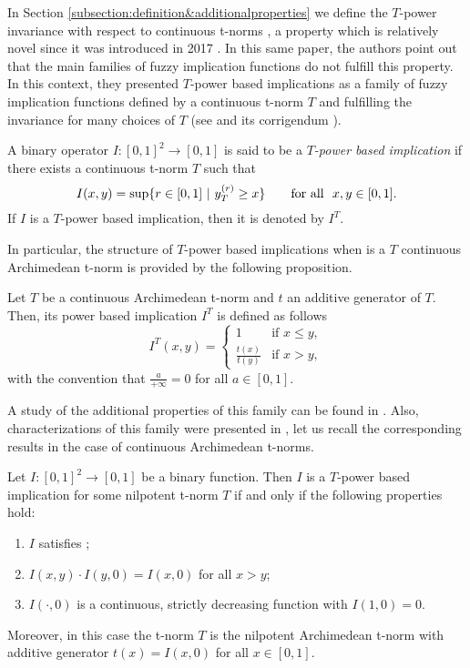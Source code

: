 In Section \ref{subsection:definition&additionalproperties} we define the $T$-power invariance with respect to continuous t-norms \PIT, a property which is relatively novel since it was introduced in 2017 \cite{Massanet2017}. In this same paper, the authors point out that the main families of fuzzy implication functions do not fulfill this property. In this context, they presented $T$-power based implications as a family of fuzzy implication functions defined by a continuous t-norm $T$ and fulfilling the invariance for many choices of $T$ (see \cite{Massanet2017} and its corrigendum \cite{Massanet2019}). 

\begin{definition}
	A binary operator $I:[0,1]^2\to[0,1]$ is said to be a \emph{$T$-power based implication} if there exists a continuous t-norm $T$ such that 
	\[
	I(x,y)=\sup \{r \in [0,1] \ | \ y_T^{(r)} \geq x \}\qquad \hbox{for all } \  x, y \in [0,1].
	\]
	If $I$ is a $T$-power based implication, then it is denoted by $I^T$.
\end{definition}
In particular, the structure of $T$-power based implications when is a $T$ continuous Archimedean t-norm is provided by the following proposition.
\begin{proposition} Let $T$ be a continuous Archimedean t-norm and $t$ an additive generator of $T$. Then, its power based implication $I^T$ is defined as follows
	$$
	I^T(x,y)
	=
	\left\{ \begin{array}{ll}
		1 &  \text{if }  x \leq y, \\[3pt]
		\frac{t(x)}{t(y)} & \text{if }  x>y,
	\end{array}
	\right.
	$$
	with the convention that $\frac{a}{+\infty}=0$ for all $a \in [0,1]$.
\end{proposition}

A study of the additional properties of this family can be found in \cite{Massanet2017,Massanet2019B,Li2022,Li2023,Peng2022B,Peng2022}. Also, characterizations of this family were presented in \cite{Massanet2019B}, let us recall the corresponding results in the case of continuous Archimedean t-norms.

\begin{proposition}
	Let $I: [0,1]^2 \to [0,1]$ be a binary function. Then $I$ is a $T$-power based implication for some nilpotent t-norm $T$ if and only if the following properties hold:
	\begin{enumerate}[label=(\roman*)]
		\item $I$ satisfies \OP;
		\item $I(x,y) \cdot I(y,0)=I(x,0)$ for all $x>y$;
		\item $I(\cdot,0)$ is a continuous, strictly decreasing function with $I(1,0)=0$.
	\end{enumerate}
	Moreover, in this case the t-norm $T$ is the nilpotent Archimedean t-norm with additive generator $t(x)=I(x,0)$ for all $x \in [0,1]$.
\end{proposition}

